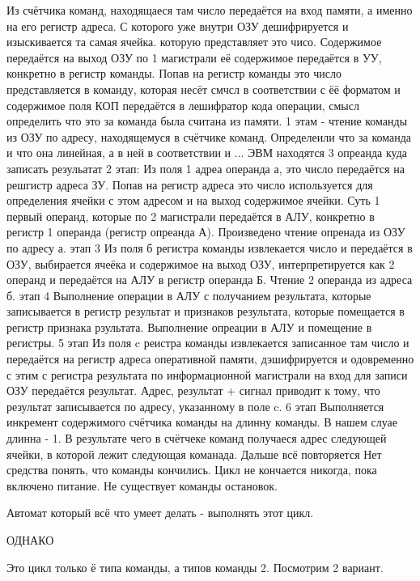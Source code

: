 \documentclass[12px]{article}
\begin{document}
\iffalse
Из счётчика команд, находящаеся там число передаётся на вход памяти, а именно на его регистр адреса. С которого уже внутри ОЗУ дешифрируется и изыскивается та самая ячейка. которую представляет это чисо. Содержимое передаётся на выход ОЗУ по 1 магистрали её содержимое передаётся в УУ, конкретно в регистр команды. Попав на регистр команды это число представляется в команду, которая несёт смчсл в соответствии с ёё форматом и содержимое поля КОП передаётся в лешифратор кода операции, смысл определить что это за команда была считана из памяти. 
1 этам - чтение команды из ОЗУ по адресу, находящемуся в счётчике команд. 
Определеили что за команда и что она линейная, а в ней в соответствии и ... ЭВМ находятся 3 опреанда куда записать резульатат
2 этап:
Из поля 1 адреа операнда а, это число передаётся на решгистр адреса ЗУ. Попав на регистр адреса это число используется для определения ячейки с этом адресом и на выход содержимое ячейки. Суть 1 первый операнд, которые по 2 магистрали передаётся в АЛУ, конкретно в регистр 1 операнда (регистр опреанда А). Произведено чтение опренада из ОЗУ по адресу а. 
этап 3
Из поля б регистра команды извлекается число и передаётся в ОЗУ, выбирается ячеёка и содержимое на выход ОЗУ, интерпретируется как 2 операнд и передаётся на АЛУ в регистр операнда Б. Чтение 2 операнда из адреса б. 
этап 4 
Выполнение операции в АЛУ с получанием результата, которые записывается в регистр результат и признаков результата, которые помещается в регистр признака рзультата. Выполнение опреации в АЛУ и помещение в регистры. 
5 этап 
Из поля c реистра команды извлекается записанное там число и передаётся на регистр адреса оперативной памяти, дэшифрируется и одовременно с этим с регистра результата по информационной магистрали на вход для записи ОЗУ передаётся результат. Адрес, результат + сигнал приводит к тому, что результат записывается по адресу, указанному в поле c. 
6 этап
Выполняется инкремент содержимого счётчика команды на длинну команды. В нашем слуае длинна - 1. В результате чего в счётчеке команд получаеся адрес следующей ячейки, в которой лежит следующая команада. 
Дальше всё повторяется
Нет средства понять, что команды кончились. Цикл не кончается никогда, пока включено питание. Не существует команды остановок. 

Автомат который всё что умеет делать - выполнять этот цикл. 

ОДНАКО


Это цикл только ё типа команды, а типов команды 2. 
Посмотрим 2 вариант. 
\end{document}
